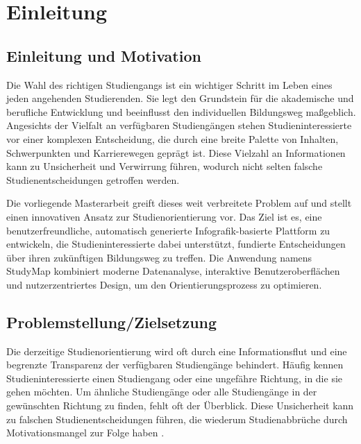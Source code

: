 \section{Einleitung}\label{einleitung}
\subsection{Einleitung und Motivation}\label{einleitung-und-motivation}
Die Wahl des richtigen Studiengangs ist ein wichtiger Schritt im Leben eines jeden angehenden Studierenden. Sie legt den Grundstein für die akademische und berufliche Entwicklung und beeinflusst den individuellen Bildungsweg maßgeblich. Angesichts der Vielfalt an verfügbaren Studiengängen stehen Studieninteressierte vor einer komplexen Entscheidung, die durch eine breite Palette von Inhalten,  Schwerpunkten und Karrierewegen geprägt ist. Diese Vielzahl an Informationen kann zu Unsicherheit und Verwirrung führen, wodurch nicht selten falsche Studienentscheidungen getroffen werden. \parencite{beckmann_verbesserung_2021}

Die vorliegende Masterarbeit greift dieses weit verbreitete Problem auf und stellt einen innovativen Ansatz zur Studienorientierung vor. Das Ziel ist es, eine benutzerfreundliche, automatisch generierte Infografik-basierte Plattform zu entwickeln, die Studieninteressierte dabei unterstützt, fundierte Entscheidungen über ihren zukünftigen Bildungsweg zu treffen. Die Anwendung namens StudyMap kombiniert moderne Datenanalyse, interaktive Benutzeroberflächen und nutzerzentriertes Design, um den Orientierungsprozess zu optimieren.

\subsection{Problemstellung/Zielsetzung}\label{problemstellung-zielsetzung}
Die derzeitige Studienorientierung wird oft durch eine Informationsflut und eine begrenzte Transparenz der verfügbaren Studiengänge behindert. Häufig kennen Studieninteressierte einen Studiengang oder eine ungefähre Richtung, in die sie gehen möchten. Um ähnliche Studiengänge oder alle Studiengänge in der gewünschten Richtung zu finden, fehlt oft der Überblick. \parencite{beckmann_verbesserung_2021} Diese Unsicherheit kann zu falschen Studienentscheidungen führen, die wiederum Studienabbrüche durch Motivationsmangel zur Folge haben \parencite{heublein_ursachen_2010}.

